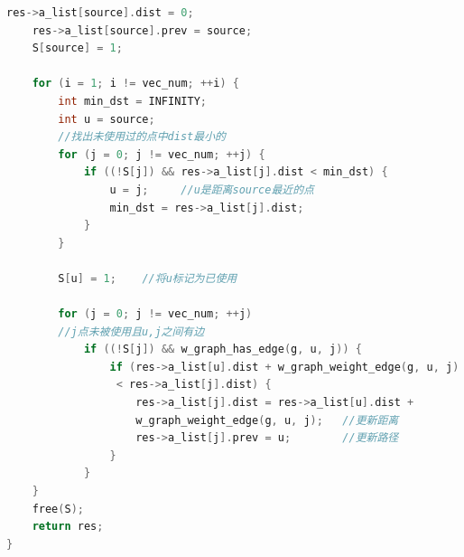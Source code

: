 \documentclass[a4paper,10pt]{ctexart}
\begin{document}
\begin{lstlisting}[language={C}]
    res->a_list[source].dist = 0;
    res->a_list[source].prev = source;
    S[source] = 1;

    for (i = 1; i != vec_num; ++i) {
        int min_dst = INFINITY;
        int u = source;
        //找出未使用过的点中dist最小的
        for (j = 0; j != vec_num; ++j) {
            if ((!S[j]) && res->a_list[j].dist < min_dst) {
                u = j;     //u是距离source最近的点
                min_dst = res->a_list[j].dist;
            }
        }

        S[u] = 1;    //将u标记为已使用

        for (j = 0; j != vec_num; ++j)
        //j点未被使用且u,j之间有边
            if ((!S[j]) && w_graph_has_edge(g, u, j)) {
                if (res->a_list[u].dist + w_graph_weight_edge(g, u, j)
                 < res->a_list[j].dist) {
                    res->a_list[j].dist = res->a_list[u].dist +
                    w_graph_weight_edge(g, u, j);   //更新距离
                    res->a_list[j].prev = u;        //更新路径
                }
            }
    }
    free(S);
    return res;
}
\end{lstlisting}
\end{document}
